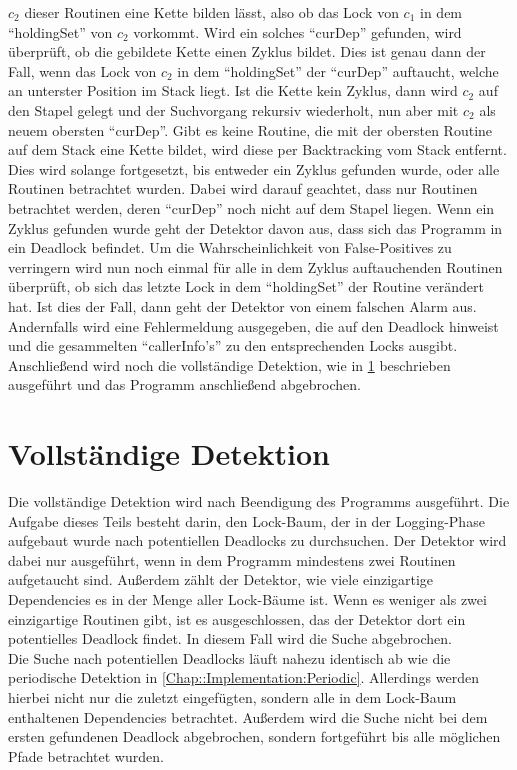  $c_2$ dieser 
Routinen eine Kette bilden lässt, also ob das Lock von $c_1$ in dem 
``holdingSet'' von $c_2$ vorkommt. Wird ein solches 
``curDep'' gefunden, wird überprüft, ob die gebildete Kette einen Zyklus bildet.
Dies ist genau dann der Fall, wenn das Lock von $c_2$ in dem ``holdingSet''
der ``curDep'' auftaucht, welche an unterster Position im Stack liegt. Ist 
die Kette kein Zyklus, dann wird $c_2$ auf den Stapel gelegt und der Suchvorgang
rekursiv wiederholt, nun aber mit $c_2$ als neuem obersten ``curDep''. 
Gibt es keine Routine, die mit der obersten Routine auf dem Stack eine Kette 
bildet, wird diese per Backtracking vom Stack entfernt. Dies wird
solange fortgesetzt, bis entweder ein Zyklus gefunden wurde, oder alle Routinen 
betrachtet wurden. Dabei wird darauf geachtet, dass nur Routinen betrachtet 
werden, deren ``curDep'' noch nicht auf dem Stapel liegen. Wenn ein Zyklus 
gefunden wurde geht der Detektor davon aus, dass sich das Programm in ein
Deadlock befindet. Um die Wahrscheinlichkeit von False-Positives zu verringern
wird nun noch einmal für alle in dem Zyklus auftauchenden Routinen überprüft,
ob sich das letzte Lock in dem ``holdingSet'' der Routine verändert hat. Ist dies 
der Fall, dann geht der Detektor von einem falschen Alarm aus. Andernfalls 
wird eine Fehlermeldung ausgegeben, die auf den Deadlock hinweist und die 
gesammelten ``callerInfo's'' zu den entsprechenden Locks ausgibt. Anschließend
wird noch die vollständige Detektion, wie in \ref{Chap::Implementation:Complete}
beschrieben ausgeführt und das Programm anschließend abgebrochen. 


\section{Vollständige Detektion} \label{Chap::Implementation:Complete}
Die vollständige Detektion wird nach Beendigung des Programms ausgeführt. 
Die Aufgabe dieses Teils besteht darin, den Lock-Baum, der in der Logging-Phase 
aufgebaut wurde nach potentiellen Deadlocks zu durchsuchen. Der Detektor wird 
dabei nur ausgeführt, wenn in dem Programm 
mindestens zwei Routinen aufgetaucht sind. Außerdem zählt der Detektor, wie 
viele einzigartige Dependencies es in der Menge aller Lock-Bäume ist. Wenn es 
weniger als zwei einzigartige Routinen gibt, ist es ausgeschlossen, das 
der Detektor dort ein potentielles Deadlock findet. In diesem Fall wird die 
Suche abgebrochen.\\
Die Suche nach potentiellen Deadlocks läuft nahezu identisch ab wie die 
periodische Detektion
in \ref{Chap::Implementation:Periodic}. Allerdings werden hierbei nicht nur 
die zuletzt eingefügten, sondern alle in dem Lock-Baum enthaltenen Dependencies
betrachtet. Außerdem wird die Suche nicht bei dem ersten gefundenen Deadlock 
abgebrochen, sondern fortgeführt bis alle möglichen Pfade betrachtet wurden.


